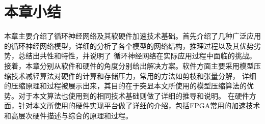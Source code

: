 \section{本章小结}
本章主要介绍了循环神经网络及其软硬件加速技术基础。首先介绍了几种广泛应用的循环神经网络模型，详细的分析了各个模型的网络结构，推理过程以及其优势劣势，总结出共性和特性，并说明了
循环神经网络在实际应用过程中面临的挑战。接着，本章分别从软件和硬件的角度分别给出解决方案。软件方面主要采用模型压缩技术减轻算法对硬件的计算和存储压力，常用的方法如剪枝和张量分解，
详细的压缩原理和过程被展示出来，其目的在于突显本文所使用的模型压缩算法的优势。对于本文算法也使用到的相同技术基础则做了详细的推导和说明。
在硬件方面，针对本文所使用的硬件实现平台做了详细的介绍，包括FPGA常用的加速技术和高层次硬件描述与综合的原理和过程。
